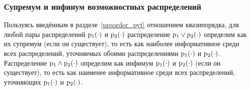 

	
\subsubsection{Супремум и инфинум возможностных распределений}
\label{inf_sup_poss}

Пользуясь введённым в разделе~\ref{preorder_pyt} отношением квазипорядка, для любой пары распределений ${\mathrm{p}}_1(\cdot)$ и ${\mathrm{p}}_2(\cdot)$ распределение ${\mathrm{p}}_1\vee{\mathrm{p}}_2(\cdot)$ определим как их супремум (если он существует), то есть как наиболее информативное среди всех распределений, уточняемых обоими распределениями ${\mathrm{p}}_1(\cdot)$ и ${\mathrm{p}}_2(\cdot)$. Распределение ${\mathrm{p}}_1\wedge{\mathrm{p}}_2(\cdot)$ определим как инфимум ${\mathrm{p}}_1(\cdot)$ и ${\mathrm{p}}_2(\cdot)$ (если он существует), то есть как наименее информативное среди всех распределений, уточняющих ${\mathrm{p}}_1(\cdot)$ и ${\mathrm{p}}_2(\cdot)$.

